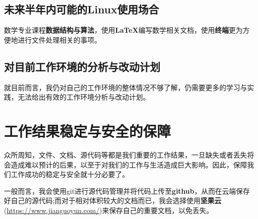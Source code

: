 \documentclass[a4paper]{ctexart}
\begin{document}
\subsection{未来半年内可能的Linux使用场合}
数学专业课程{\bf 数据结构与算法}，使用{\bf \LaTeX}编写数学相关文档，使用{\bf 终端}更为方便地进行文件处理相关的事项。
\subsection{对目前工作环境的分析与改动计划}
就目前而言，我仍对自己的工作环境的整体情况不够了解，仍需要更多的学习与实践，无法给出有效的工作环境分析与改动计划。
\section{工作结果稳定与安全的保障}
众所周知，文件、文档、源代码等都是我们重要的工作结果，一旦缺失或者丢失将会造成难以预计的后果，以至于对我们的工作与生活造成巨大影响。因此，保障我们工作成功的稳定与安全就十分必要了。

一般而言，我会使用git进行源代码管理并将代码上传至{\bf github}，从而在云端保存好自己的源代码;而对于相对体积较大的文档而已，我会选择使用{\bf 坚果云}(\url{https://www.jianguoyun.com/})来保存自己的重要文档，以免丢失。



\end{document}
